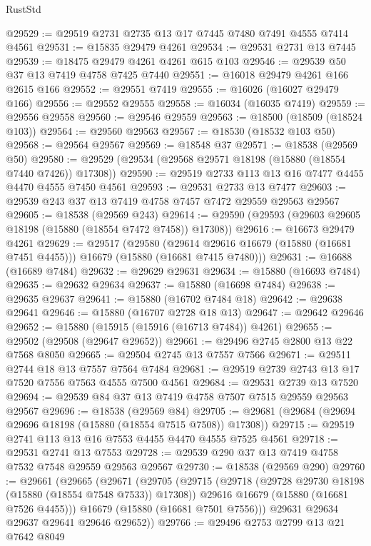 \begin{lexlean}{RustStd}
\begin{coremodule}
@29529 := @29519 @2731 @2735 @13 @17 @7445 @7480 @7491 @4555 @7414 @4561
@29531 := @15835 @29479 @4261
@29534 := @29531 @2731 @13 @7445
@29539 := @18475 @29479 @4261 @4261 @615 @103
@29546 := @29539 @50 @37 @13 @7419 @4758 @7425 @7440
@29551 := @16018 @29479 @4261 @166 @2615 @166
@29552 := @29551 @7419
@29555 := @16026 (@16027 @29479 @166)
@29556 := @29552 @29555
@29558 := @16034 (@16035 @7419)
@29559 := @29556 @29558
@29560 := @29546 @29559
@29563 := @18500 (@18509 (@18524 @103))
@29564 := @29560 @29563
@29567 := @18530 (@18532 @103 @50)
@29568 := @29564 @29567
@29569 := @18548 @37
@29571 := @18538 (@29569 @50)
@29580 := @29529 (@29534 (@29568 @29571 @18198 (@15880 (@18554 @7440 @7426)) @17308))
@29590 := @29519 @2733 @113 @13 @16 @7477 @4455 @4470 @4555 @7450 @4561
@29593 := @29531 @2733 @13 @7477
@29603 := @29539 @243 @37 @13 @7419 @4758 @7457 @7472 @29559 @29563 @29567
@29605 := @18538 (@29569 @243)
@29614 := @29590 (@29593 (@29603 @29605 @18198 (@15880 (@18554 @7472 @7458)) @17308))
@29616 := @16673 @29479 @4261
@29629 := @29517
    (@29580
      (@29614 @29616 @16679 (@15880 (@16681 @7451 @4455)))
      @16679
      (@15880 (@16681 @7415 @7480)))
@29631 := @16688 (@16689 @7484)
@29632 := @29629 @29631
@29634 := @15880 (@16693 @7484)
@29635 := @29632 @29634
@29637 := @15880 (@16698 @7484)
@29638 := @29635 @29637
@29641 := @15880 (@16702 @7484 @18)
@29642 := @29638 @29641
@29646 := @15880 (@16707 @2728 @18 @13)
@29647 := @29642 @29646
@29652 := @15880 (@15915 (@15916 (@16713 @7484)) @4261)
@29655 := @29502 (@29508 (@29647 @29652))
@29661 := @29496 @2745 @2800 @13 @22 @7568 @8050
@29665 := @29504 @2745 @13 @7557 @7566
@29671 := @29511 @2744 @18 @13 @7557 @7564 @7484
@29681 := @29519 @2739 @2743 @13 @17 @7520 @7556 @7563 @4555 @7500 @4561
@29684 := @29531 @2739 @13 @7520
@29694 := @29539 @84 @37 @13 @7419 @4758 @7507 @7515 @29559 @29563 @29567
@29696 := @18538 (@29569 @84)
@29705 := @29681 (@29684 (@29694 @29696 @18198 (@15880 (@18554 @7515 @7508)) @17308))
@29715 := @29519 @2741 @113 @13 @16 @7553 @4455 @4470 @4555 @7525 @4561
@29718 := @29531 @2741 @13 @7553
@29728 := @29539 @290 @37 @13 @7419 @4758 @7532 @7548 @29559 @29563 @29567
@29730 := @18538 (@29569 @290)
@29760 := @29661
    (@29665
      (@29671
        (@29705
          (@29715
            (@29718 (@29728 @29730 @18198 (@15880 (@18554 @7548 @7533)) @17308))
            @29616
            @16679
            (@15880 (@16681 @7526 @4455)))
          @16679
          (@15880 (@16681 @7501 @7556)))
        @29631
        @29634
        @29637
        @29641
        @29646
        @29652))
@29766 := @29496 @2753 @2799 @13 @21 @7642 @8049

\end{coremodule}
\end{lexlean}
